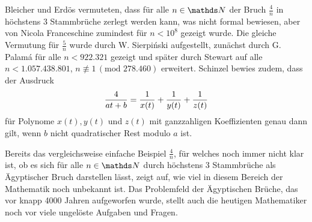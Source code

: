 Bleicher und Erdös vermuteten, dass für alle $n \in \N$ der Bruch $\frac{4}{n}$ in höchstens 3 Stammbrüche zerlegt werden kann, was nicht formal bewiesen, aber von Nicola Franceschine zumindest für $n < 10^8$ gezeigt wurde. Die gleiche Vermutung für $\frac{5}{n}$ wurde durch W. Sierpiński aufgestellt, zunächst durch G. Palamá für alle $n < 922.321$ gezeigt und später durch Stewart auf alle $n < 1.057.438.801$, $n \not\equiv 1\, (\text{mod } 278.460)$ erweitert.
Schinzel bewies zudem, dass der Ausdruck
$$\frac{4}{at+b} = \frac{1}{x(t)} + \frac{1}{y(t)} + \frac{1}{z(t)}$$
für Polynome $x(t), y(t)$ und $z(t)$ mit ganzzahligen Koeffizienten genau dann gilt, wenn $b$ nicht quadratischer Rest modulo $a$ ist. \cite[S. 88]{Guy1981}

Bereits das vergleichsweise einfache Beispiel $\frac{4}{n}$, für welches noch immer nicht klar ist, ob es sich für alle $n \in \N$ durch höchstens 3 Stammbrüche als Ägyptischer Bruch darstellen lässt, zeigt auf, wie viel in diesem Bereich der Mathematik noch unbekannt ist. Das Problemfeld der Ägyptischen Brüche, das vor knapp 4000 Jahren aufgeworfen wurde, stellt auch die heutigen Mathematiker noch vor viele ungelöste Aufgaben und Fragen.